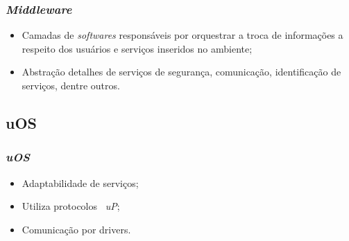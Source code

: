 \documentclass{beamer}
\begin{document}
		\begin{frame}
			\frametitle{\emph{Middleware}}
			
			\begin{itemize}
				\item	Camadas de \emph{softwares} responsáveis por orquestrar a troca 
						de informações a respeito dos usuários e serviços inseridos no ambiente;
			
				\item 	Abstração detalhes de serviços de segurança, comunicação, identificação 
						de serviços, dentre outros.
			\end{itemize}
		\end{frame}
		
		
		
	
		
		\subsection{uOS}
		\begin{frame}
			\frametitle{\emph{uOS}}
				\begin{itemize}
				  \item Adaptabilidade de serviços;
				  \item Utiliza protocolos ~\emph{uP};
				  \item Comunicação por drivers.
				\end{itemize}
		\end{frame}
		
\end{document}
